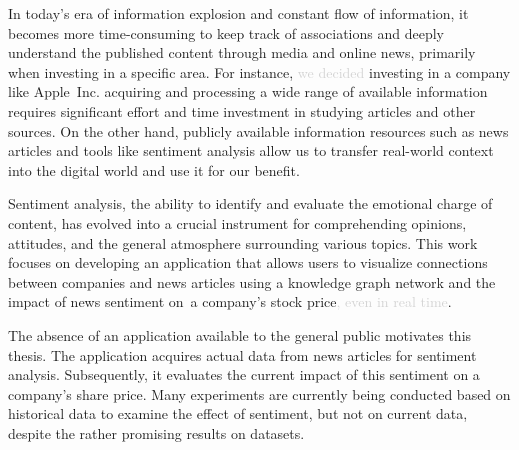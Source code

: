 

In today's era of information explosion and constant flow of information, it becomes more time-consuming to keep track of associations and deeply understand the published content through media and online news, primarily when investing in a specific area. For instance, \textcolor{lightgray}{we decided} investing in a company like Apple~Inc. acquiring and processing a wide range of available information requires significant effort and time investment in studying articles and other sources. On the other hand, publicly available information resources such as news articles and tools like sentiment analysis allow us to transfer real-world context into the digital world and use it for our benefit.

Sentiment analysis, the ability to identify and evaluate the emotional charge of content, has evolved into a crucial instrument for comprehending opinions, attitudes, and the general atmosphere surrounding various topics. This work focuses on developing an application that allows users to visualize connections between companies and news articles using a knowledge graph network and the impact of news sentiment on~a company's stock price\textcolor{lightgray}{, even in real time}.

The absence of an application available to the general public motivates this thesis. The application acquires actual data from news articles for sentiment analysis. Subsequently, it evaluates the current impact of this sentiment on a company's share price. Many experiments are currently being conducted based on historical data to examine the effect of sentiment, but not on current data, despite the rather promising results on datasets.


 
